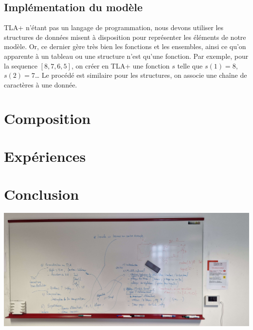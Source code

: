 \documentclass[runningheads]{llncs}
\begin{document}
\subsection{Implémentation du modèle}
TLA+ n'étant pas un langage de programmation, nous devons utiliser les structures de données misent à disposition pour représenter les éléments de notre modèle.
Or, ce dernier gère très bien les fonctions et les ensembles, ainsi ce qu'on apparente à un tableau ou une structure n'est qu'une fonction.
Par exemple, pour la sequence $[8,7,6,5]$, on créer en TLA+ une fonction $s$ telle que $s(1) = 8$, $s(2) = 7$\dots
Le procédé est similaire pour les structures, on associe une chaîne de caractères à une donnée.


\section{Composition}
\label{sec:composition}

\section{Expériences}
\label{sec:experiments}

\newpage

\section{Conclusion}
\label{sec:conclusion}

\includegraphics[scale=0.1]{img/sommaire_tableau.jpg}




\end{document}
